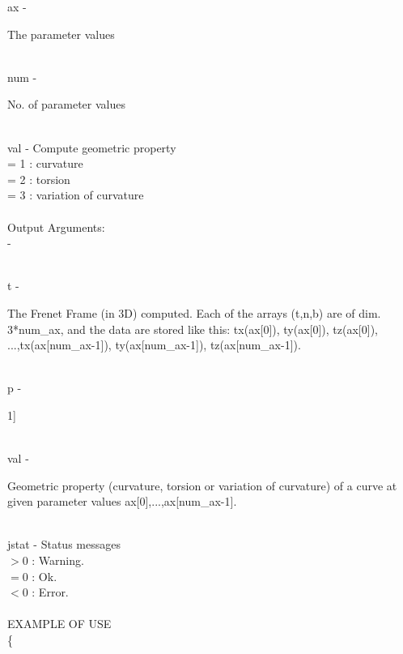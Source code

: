         \>\>    {\fov ax}\> - \>  \begin{minipg2}
                     The parameter values
                               \end{minipg2}\\
        \>\>    {\fov num}\> - \>  \begin{minipg2}
                     No. of parameter values
                               \end{minipg2}\\
        \>\>    {\fov val}\> - \> Compute geometric property \\
	        \>\>\>\>\>      = 1  : curvature \\
                \>\>\>\>\>      = 2  : torsion \\
		\>\>\>\>\>      = 3  : variation of curvature \\
\\
	\>Output Arguments:\\
        \>\>    {\fov }\> - \>  \begin{minipg2}
             
                               \end{minipg2}\\
        \>\>    {\fov t}\> - \>  \begin{minipg2}
                     The Frenet Frame (in 3D) computed. Each of the arrays
                   (t,n,b) are of dim. 3*num\_ax, and the data are
                   stored like this: tx(ax[0]), ty(ax[0]), tz(ax[0]),
                   ...,tx(ax[num\_ax-1]), ty(ax[num\_ax-1]), tz(ax[num\_ax-1]).
                               \end{minipg2}\\
        \>\>    {\fov p}\> - \>  \begin{minipg2}
                    1]
                               \end{minipg2}\\
        \>\>    {\fov val}\> - \>  \begin{minipg2}
                      Geometric property (curvature, torsion or
                  variation of curvature) of a curve at given parameter
                  values ax[0],...,ax[num\_ax-1].
                               \end{minipg2}\\
        \>\>    {\fov jstat} \> - \> Status messages\\
                \>\>\>\>\>           $> 0$ : Warning.\\
                \>\>\>\>\>           $= 0$ : Ok.\\
                \>\>\>\>\>           $< 0$ : Error.\\
\\
EXAMPLE OF USE\\
		\>      \{ \\

